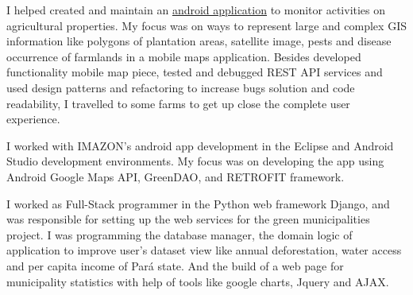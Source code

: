 \documentclass[]{joaosoares-resume}
\begin{document}
\begin{minipage}[t]{0.64\textwidth}
\sectionsep

I helped created and maintain an \href{https://play.google.com/store/apps/developer?id=TERRAS\%20App\%20Solutions}{android application} to monitor activities on agricultural properties. My focus was on ways to represent large and complex GIS information like polygons of plantation areas, satellite image, pests and disease occurrence of farmlands in a mobile maps application. Besides developed functionality mobile map piece, tested and debugged REST API services and used design patterns and refactoring to increase bugs solution and code readability, I travelled to some farms to get up close the complete user experience.

\sectionsep

\sectionsep 

I worked with IMAZON’s android app development in the Eclipse and Android Studio development environments. My focus was on developing the app using Android Google Maps API, GreenDAO, and RETROFIT framework.

\sectionsep

\sectionsep 

I worked as Full-Stack programmer in the Python web framework Django, and was responsible for setting up the web services for the green municipalities project. I was programming the database manager, the domain logic of application to improve user’s dataset view like annual deforestation, water access and per capita income of Pará state. And the build of a web page for municipality statistics with help of tools like google charts, Jquery and  AJAX.

\sectionsep

\end{minipage} 
\end{document}
